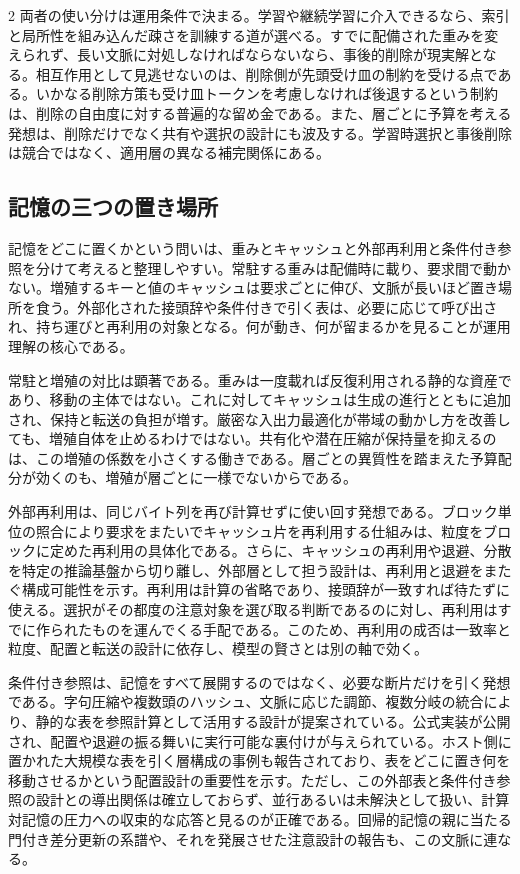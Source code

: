 \documentclass[lualatex,a4paper,10pt]{jlreq}
\begin{document}
\begin{multicols}{2}
両者の使い分けは運用条件で決まる。学習や継続学習に介入できるなら、索引と局所性を組み込んだ疎さを訓練する道が選べる。すでに配備された重みを変えられず、長い文脈に対処しなければならないなら、事後的削除が現実解となる。相互作用として見逃せないのは、削除側が先頭受け皿の制約を受ける点である。いかなる削除方策も受け皿トークンを考慮しなければ後退するという制約は、削除の自由度に対する普遍的な留め金である\autocite{sinks}。また、層ごとに予算を考える発想は、削除だけでなく共有や選択の設計にも波及する。学習時選択と事後削除は競合ではなく、適用層の異なる補完関係にある。

\subsection{記憶の三つの置き場所}
記憶をどこに置くかという問いは、重みとキャッシュと外部再利用と条件付き参照を分けて考えると整理しやすい。常駐する重みは配備時に載り、要求間で動かない。増殖するキーと値のキャッシュは要求ごとに伸び、文脈が長いほど置き場所を食う。外部化された接頭辞や条件付きで引く表は、必要に応じて呼び出され、持ち運びと再利用の対象となる。何が動き、何が留まるかを見ることが運用理解の核心である。

常駐と増殖の対比は顕著である。重みは一度載れば反復利用される静的な資産であり、移動の主体ではない。これに対してキャッシュは生成の進行とともに追加され、保持と転送の負担が増す。厳密な入出力最適化が帯域の動かし方を改善しても、増殖自体を止めるわけではない\autocite{flashattn}。共有化や潜在圧縮が保持量を抑えるのは、この増殖の係数を小さくする働きである\autocite{mqa}\autocite{gqa}\autocite{flashmla}。層ごとの異質性を踏まえた予算配分が効くのも、増殖が層ごとに一様でないからである\autocite{pyramidkv}。

外部再利用は、同じバイト列を再び計算せずに使い回す発想である。ブロック単位の照合により要求をまたいでキャッシュ片を再利用する仕組みは、粒度をブロックに定めた再利用の具体化である\autocite{vllmprefix}。さらに、キャッシュの再利用や退避、分散を特定の推論基盤から切り離し、外部層として担う設計は、再利用と退避をまたぐ構成可能性を示す\autocite{lmcache}。再利用は計算の省略であり、接頭辞が一致すれば待たずに使える。選択がその都度の注意対象を選び取る判断であるのに対し、再利用はすでに作られたものを運んでくる手配である。このため、再利用の成否は一致率と粒度、配置と転送の設計に依存し、模型の賢さとは別の軸で効く。

条件付き参照は、記憶をすべて展開するのではなく、必要な断片だけを引く発想である。字句圧縮や複数頭のハッシュ、文脈に応じた調節、複数分岐の統合により、静的な表を参照計算として活用する設計が提案されている\autocite{engram}。公式実装が公開され、配置や退避の振る舞いに実行可能な裏付けが与えられている\autocite{engramimpl}。ホスト側に置かれた大規模な表を引く層構成の事例も報告されており、表をどこに置き何を移動させるかという配置設計の重要性を示す\autocite{qwenreadme}。ただし、この外部表と条件付き参照の設計との導出関係は確立しておらず、並行あるいは未解決として扱い、計算対記憶の圧力への収束的な応答と見るのが正確である\autocite{qwenlineage}。回帰的記憶の親に当たる門付き差分更新の系譜や、それを発展させた注意設計の報告も、この文脈に連なる\autocite{gdn}\autocite{kimilinear}\autocite{kda}。


\end{multicols}
\end{document}
